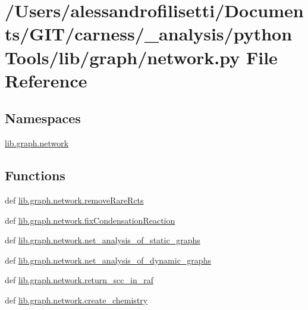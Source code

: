 \hypertarget{a00090}{\section{/\+Users/alessandrofilisetti/\+Documents/\+G\+I\+T/carness/\+\_\+analysis/python\+Tools/lib/graph/network.py File Reference}
\label{a00090}
}
\subsection*{Namespaces}
\begin{DoxyCompactItemize}
\item 
 \hyperlink{a00142}{lib.\+graph.\+network}
\end{DoxyCompactItemize}
\subsection*{Functions}
\begin{DoxyCompactItemize}
\item 
def \hyperlink{a00142_aa023644e6dad3ed7be55a592d8576007}{lib.\+graph.\+network.\+remove\+Rare\+Rcts}
\item 
def \hyperlink{a00142_a31099e87728bb8b899360bb641bb6b64}{lib.\+graph.\+network.\+fix\+Condensation\+Reaction}
\item 
def \hyperlink{a00142_a47be50a907814919f86f8313927d3236}{lib.\+graph.\+network.\+net\+\_\+analysis\+\_\+of\+\_\+static\+\_\+graphs}
\item 
def \hyperlink{a00142_ab2528d394362bfca89834b72d8024e6f}{lib.\+graph.\+network.\+net\+\_\+analysis\+\_\+of\+\_\+dynamic\+\_\+graphs}
\item 
def \hyperlink{a00142_a5c4fdcb64dea8b366645ad27dc71bff8}{lib.\+graph.\+network.\+return\+\_\+scc\+\_\+in\+\_\+raf}
\item 
def \hyperlink{a00142_a22ad63e3d10c613dc181b9e69ad1cef5}{lib.\+graph.\+network.\+create\+\_\+chemistry}
\end{DoxyCompactItemize}
